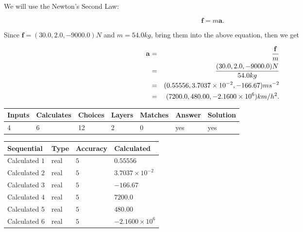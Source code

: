 \documentclass[12pt]{article}
\begin{document}
We will use the Newton's Second Law:
 
\[
\mathbf{f}=m\mathbf{a}.
\]
 
Since $\mathbf{f}=( %
30.0,  %
2.0,  %
-9000.0 )N$
and $m= %
54.0 kg$, bring them into the above equation, then we get
 
\begin{eqnarray*}
\mathbf{a}&=&\frac{\mathbf{f}}m  \\
&=&\frac{(
30.0 ,
2.0 ,
-9000.0 )N
}{ %
54.0 kg}  \\
&=&(
0.55556 ,
3.7037 \times 10^{-2},
-166.67
)ms^{-2} \\
&=&(
7200.0 ,
480.00 ,
-2.1600 \times 10^{6}
)km/h^2.
\end{eqnarray*}
 
 
 
\noindent{}
 
 

 
 
\vspace{0.3in}
   
   
   
   
\noindent\begin{tabular}{|l|l|l|l|l|l|l|}
 \hline
Inputs & Calculates & Choices & Layers & Matches & Answer & Solution \\ \hline
           4  & 
           6  & 
          12
  & 
           2  & 
           0  & 
  yes & 
  yes 
  \\ \hline
 \end{tabular}
   
   
   
   
\noindent{}
   
   
  
  
\noindent\begin{tabular}{|l|l|l|l|}
\hline
 Sequential & Type & Accuracy & Calculated \\ 
\hline
 
 
  Calculated $            1 $ & real & $            5  $ & 
 $ 0.55556 $ 
 \\  \hline  
 
 
  Calculated $            2 $ & real & $            5  $ & 
 $ 3.7037 \times 10^{-2} $ 
 \\  \hline  
 
 
  Calculated $            3 $ & real & $            5  $ & 
 $ -166.67 $ 
 \\  \hline  
 
 
  Calculated $            4 $ & real & $            5  $ & 
 $ 7200.0 $ 
 \\  \hline  
 
 
  Calculated $            5 $ & real & $            5  $ & 
 $ 480.00 $ 
 \\  \hline  
 
 
  Calculated $            6 $ & real & $            5  $ & 
 $ -2.1600 \times 10^{6} $ 
 \\  \hline  
 \end{tabular}
   
\end{document}
